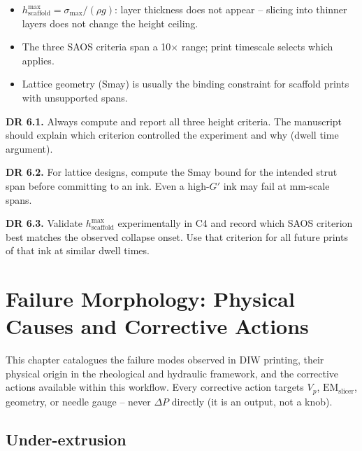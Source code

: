 \documentclass[11pt,a4paper]{article}
\begin{document}
\begin{takeawaybox}
\begin{itemize}[leftmargin=1.4em,itemsep=2pt]
\item $h_\mathrm{scaffold}^{\max}=\sigma_\mathrm{max}/(\rho g)$:
  layer thickness does not appear -- slicing into thinner layers does
  not change the height ceiling.
\item The three SAOS criteria span a 10$\times$ range; print timescale
  selects which applies.
\item Lattice geometry (Smay) is usually the binding constraint for
  scaffold prints with unsupported spans.
\end{itemize}
\end{takeawaybox}

\begin{designrulebox}
\textbf{DR 6.1.} Always compute and report all three height criteria.
The manuscript should explain which criterion controlled the experiment
and why (dwell time argument).

\textbf{DR 6.2.} For lattice designs, compute the Smay bound for the
intended strut span before committing to an ink. Even a high-$G'$ ink
may fail at mm-scale spans.

\textbf{DR 6.3.} Validate $h_\mathrm{scaffold}^{\max}$ experimentally
in C4 and record which SAOS criterion best matches the observed
collapse onset. Use that criterion for all future prints of that ink
at similar dwell times.
\end{designrulebox}

\section{Failure Morphology: Physical Causes and Corrective Actions}
\label{sec:failure}

This chapter catalogues the failure modes observed in DIW printing,
their physical origin in the rheological and hydraulic framework, and
the corrective actions available within this workflow. Every corrective
action targets $V_p$, $\mathrm{EM}_\mathrm{slicer}$, geometry, or
needle gauge -- never $\Delta P$ directly (it is an output, not a knob).

\subsection{Under-extrusion}
\end{document}
